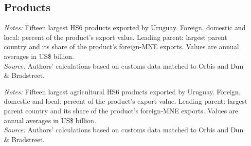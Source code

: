 \documentclass[11pt,a4paper]{article}
\begin{document}
\subsection{Products}
\begin{table}[H]\centering\footnotesize%
  \caption{Uruguay: Fifteen Largest Export Products}%
  \label{tab:c_hs6_URY}%
  \par\vspace{3pt}%
  \begin{minipage}{0.95\textwidth}\footnotesize %
  \textit{Notes:} Fifteen largest HS6 products exported by Uruguay. Foreign, domestic and local: percent of the product's export value. Leading parent: largest parent country and its share of the product's foreign-MNE exports. Values are annual averages in US\$ billion.\\[3pt]%
  \textit{Source:} Authors' calculations based on customs data matched to Orbis and Dun \& Bradstreet.%
  \end{minipage}%
  \end{table}
\begin{table}[H]\centering\footnotesize%
  \caption{Uruguay, Agriculture: Fifteen Largest Export Products}%
  \label{tab:c_hs6_URY_agro}%
  \par\vspace{3pt}%
  \begin{minipage}{0.95\textwidth}\footnotesize %
  \textit{Notes:} Fifteen largest agricultural HS6 products exported by Uruguay. Foreign, domestic and local: percent of the product's export value. Leading parent: largest parent country and its share of the product's foreign-MNE exports. Values are annual averages in US\$ billion.\\[3pt]%
  \textit{Source:} Authors' calculations based on customs data matched to Orbis and Dun \& Bradstreet.%
  \end{minipage}%
  \end{table}
\end{document}

